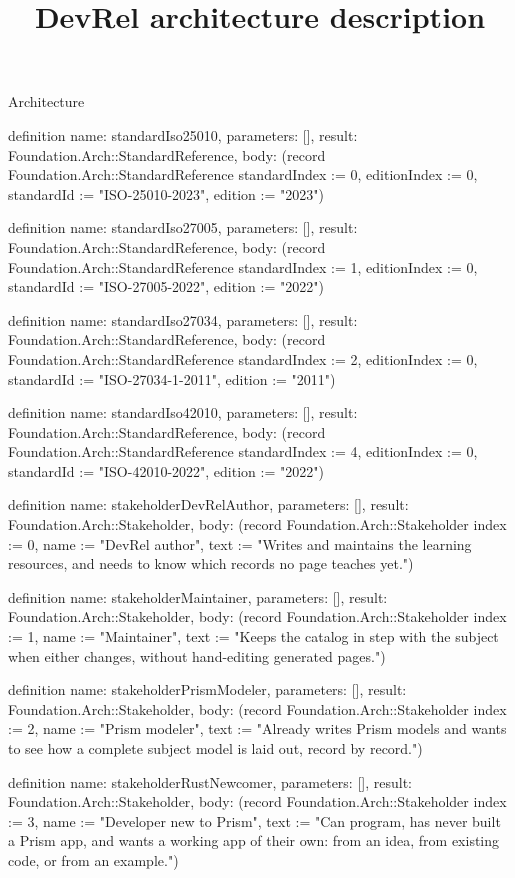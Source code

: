 \begin{lexlean}{Architecture}
\title{DevRel architecture description}
\begin{semanticmodule}
definition{
  name: standardIso25010,
  parameters: [],
  result: Foundation.Arch::StandardReference,
  body: (record Foundation.Arch::StandardReference {standardIndex := 0, editionIndex := 0, standardId := "ISO-25010-2023", edition := "2023"})
}

definition{
  name: standardIso27005,
  parameters: [],
  result: Foundation.Arch::StandardReference,
  body: (record Foundation.Arch::StandardReference {standardIndex := 1, editionIndex := 0, standardId := "ISO-27005-2022", edition := "2022"})
}

definition{
  name: standardIso27034,
  parameters: [],
  result: Foundation.Arch::StandardReference,
  body: (record Foundation.Arch::StandardReference {standardIndex := 2, editionIndex := 0, standardId := "ISO-27034-1-2011", edition := "2011"})
}

definition{
  name: standardIso42010,
  parameters: [],
  result: Foundation.Arch::StandardReference,
  body: (record Foundation.Arch::StandardReference {standardIndex := 4, editionIndex := 0, standardId := "ISO-42010-2022", edition := "2022"})
}

definition{
  name: stakeholderDevRelAuthor,
  parameters: [],
  result: Foundation.Arch::Stakeholder,
  body: (record Foundation.Arch::Stakeholder {index := 0, name := "DevRel author", text := "Writes and maintains the learning resources, and needs to know which records no page teaches yet."})
}

definition{
  name: stakeholderMaintainer,
  parameters: [],
  result: Foundation.Arch::Stakeholder,
  body: (record Foundation.Arch::Stakeholder {index := 1, name := "Maintainer", text := "Keeps the catalog in step with the subject when either changes, without hand-editing generated pages."})
}

definition{
  name: stakeholderPrismModeler,
  parameters: [],
  result: Foundation.Arch::Stakeholder,
  body: (record Foundation.Arch::Stakeholder {index := 2, name := "Prism modeler", text := "Already writes Prism models and wants to see how a complete subject model is laid out, record by record."})
}

definition{
  name: stakeholderRustNewcomer,
  parameters: [],
  result: Foundation.Arch::Stakeholder,
  body: (record Foundation.Arch::Stakeholder {index := 3, name := "Developer new to Prism", text := "Can program, has never built a Prism app, and wants a working app of their own: from an idea, from existing code, or from an example."})
}


\end{semanticmodule}
\end{lexlean}
